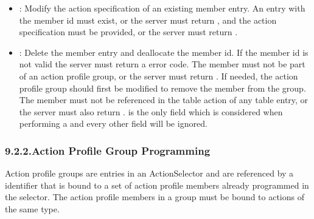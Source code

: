 \documentclass[11pt]{article}
\begin{document}
{\begin{itemize}[noitemsep,topsep=\mdcompacttopsep]
\item{}: Modify the action specification of an existing member entry. An
entry with the member id must exist, or the server must return ,
and the action specification must be provided, or the server must return
.%

\item{}: Delete the member entry and deallocate the member id. If the member
id is not valid the server must return a  error code. The member
must not be part of an action profile group, or the server must return
. If needed, the action profile group should first be
modified to remove the member from the group. The member must not be
referenced in the table action of any table entry, or the server must also
return .  is the only field which is
considered when performing a  and every other field will be ignored.%
\end{itemize}%

\subsubsection{9.2.2.\hspace*{0.5em}Action Profile Group Programming}\label{sec-action-profile-group-programming}%

\noindent{}Action profile groups are entries in an ActionSelector and are referenced by a
 identifier that is bound to a set of action profile members already
programmed in the selector. The action profile members in a group must be bound
to actions of the same type.%

}
\end{document}
